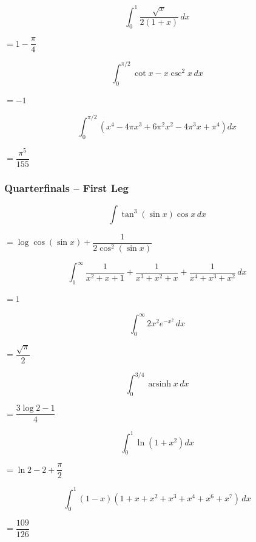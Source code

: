 \begin{questions}
\question \[ \int_0^1 \frac{\sqrt{x}}{2(1+x)}\, dx \]
\begin{solution} $= 1-\dfrac{\pi}{4}$ \end{solution}

\question \[ \int_0^{\pi/2} \cot x - x\csc^2 x\, dx \]
\begin{solution} $= -1$ \end{solution}

\question \[ \int_0^{\pi/2} \left(x^4-4\pi x^3+6\pi^2x^2-4\pi^3x+\pi^4\right) dx \]
\begin{solution} $= \dfrac{\pi^5}{155}$ \end{solution}

\end{questions}

\subsubsection*{Quarterfinals -- First Leg}
\begin{questions}

\question \[ \int \tan^3(\sin x)\cos x\, dx \]
\begin{solution} $= \log\cos(\sin x) + \dfrac{1}{2\cos^2(\sin x)}$ \end{solution}

\question \[ \int_1^\infty \frac{1}{x^2+x+1}+\frac{1}{x^3+x^2+x}+\frac{1}{x^4+x^3+x^2}\, dx \]
\begin{solution} $= 1$ \end{solution}

\question \[ \int_0^\infty 2x^2e^{-x^2}\, dx \]
\begin{solution} $= \dfrac{\sqrt{\pi}}{2}$ \end{solution}

\question \[ \int_0^{3/4} \operatorname{arsinh}x\, dx \]
\begin{solution} $= \dfrac{3\log 2 - 1}{4}$ \end{solution}

\question[Tiebreaker 1] \[ \int_0^1 \ln\left(1+x^2\right) dx \]
\begin{solution} $= \ln 2 - 2 + \dfrac{\pi}{2}$ \end{solution}

\question[Tiebreaker 2] \[ \int_0^1 (1-x)(1+x+x^2+x^3+x^4+x^6+x^7)\, dx \]
\begin{solution} $= \dfrac{109}{126}$ \end{solution}

\end{questions}

